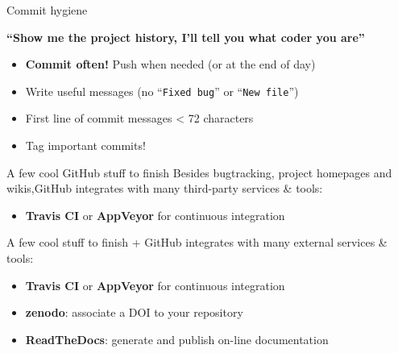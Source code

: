 \documentclass[compress]{beamer}
\begin{document}
\begin{frame}{Commit hygiene}
    \centering

    {\bf ``Show me the project history, I'll tell you what coder you are''}

    \begin{itemize}
        \item<1> {\bf Commit often!} Push when needed (or at the end of day)
        \item<2> Write useful messages (no ``\texttt{Fixed bug}'' or ``\texttt{New
            file}'')
        \item<2> First line of commit messages < 72 characters
        \item<3> Tag important commits!
    \end{itemize}

\end{frame}

\begin{frame}{A few cool GitHub stuff to finish}
    Besides bugtracking, project homepages and wikis,GitHub integrates with many
    third-party services \& tools:

    \begin{itemize}
        \item {\bf Travis CI} or {\bf AppVeyor} for continuous integration
    \end{itemize}
\end{frame}


\begin{frame}{A few cool stuff to finish}
    + GitHub integrates with many external services 
    \& tools:

    \begin{itemize}
        \item {\bf Travis CI} or {\bf AppVeyor} for continuous integration
        \item {\bf zenodo}: associate a DOI to your repository
        \item {\bf ReadTheDocs}: generate and publish on-line 
            documentation
    \end{itemize}
\end{frame}
\end{document}
